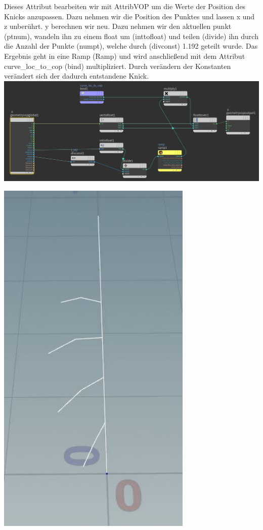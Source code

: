 \documentclass[paper=a4,fontsize=12pt,ngerman]{scrartcl}
\begin{document}
	Dieses Attribut bearbeiten wir mit AttribVOP um die Werte der Position des Knicks anzupassen. Dazu nehmen wir die Position des Punktes und lassen x und z unberührt. y berechnen wir neu. Dazu nehmen wir den aktuellen punkt (ptnum), wandeln ihn zu einem float um (inttofloat) und teilen (divide) ihn durch die Anzahl der Punkte (numpt), welche durch (divconst) 1.192 geteilt wurde. Das Ergebnis geht in eine Ramp (Ramp) und wird anschließend mit dem Attribut curve\_loc\_to\_cop (bind) multipliziert. Durch verändern der Konstanten verändert sich der dadurch entstandene Knick.\\ 
	\includegraphics*[width=\textwidth]{graphics/attribvop.JPG}\\
	\begin{minipage}{0.3\textwidth}
		\includegraphics[width=0.7\textwidth]{graphics/blossom1.JPG}
	\end{minipage}
\end{document}
